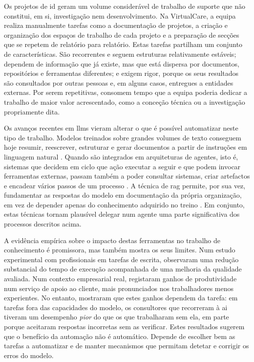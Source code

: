 Os projetos de \gls{id} geram um volume considerável de trabalho de suporte que não constitui, em si, investigação nem desenvolvimento. Na VirtualCare, a equipa realiza manualmente tarefas como a documentação de projetos, a criação e organização dos espaços de trabalho de cada projeto e a preparação de secções que se repetem de relatório para relatório. Estas tarefas partilham um conjunto de características. São recorrentes e seguem estruturas relativamente estáveis; dependem de informação que já existe, mas que está dispersa por documentos, repositórios e ferramentas diferentes; e exigem rigor, porque os seus resultados são consultados por outras pessoas e, em alguns casos, entregues a entidades externas. Por serem repetitivas, consomem tempo que a equipa poderia dedicar a trabalho de maior valor acrescentado, como a conceção técnica ou a investigação propriamente dita.

Os avanços recentes em \glspl{llm} vieram alterar o que é possível automatizar neste tipo de trabalho. Modelos treinados sobre grandes volumes de texto conseguem hoje resumir, reescrever, estruturar e gerar documentos a partir de instruções em linguagem natural \parencite{brown2020language,zhao2023survey}. Quando são integrados em arquiteturas de agentes, isto é, sistemas que decidem em ciclo que ação executar a seguir e que podem invocar ferramentas externas, passam também a poder consultar sistemas, criar artefactos e encadear vários passos de um processo \parencite{yao2023react,wang2024survey,xi2023rise}. A técnica de \gls{rag} permite, por sua vez, fundamentar as respostas do modelo em documentação da própria organização, em vez de depender apenas do conhecimento adquirido no treino \parencite{lewis2020retrieval}. Em conjunto, estas técnicas tornam plausível delegar num agente uma parte significativa dos processos descritos acima.

A evidência empírica sobre o impacto destas ferramentas no trabalho de conhecimento é promissora, mas também mostra os seus limites. Num estudo experimental com profissionais em tarefas de escrita, \textcite{noy2023experimental} observaram uma redução substancial do tempo de execução acompanhada de uma melhoria da qualidade avaliada. Num contexto empresarial real, \textcite{brynjolfsson2025generative} registaram ganhos de produtividade num serviço de apoio ao cliente, mais pronunciados nos trabalhadores menos experientes. No entanto, \textcite{dellacqua2023navigating} mostraram que estes ganhos dependem da tarefa: em tarefas fora das capacidades do modelo, os consultores que recorreram à \gls{ai} tiveram um desempenho \emph{pior} do que os que trabalharam sem ela, em parte porque aceitaram respostas incorretas sem as verificar. Estes resultados sugerem que o benefício da automação não é automático. Depende de escolher bem as tarefas a automatizar e de manter mecanismos que permitam detetar e corrigir os erros do modelo.

